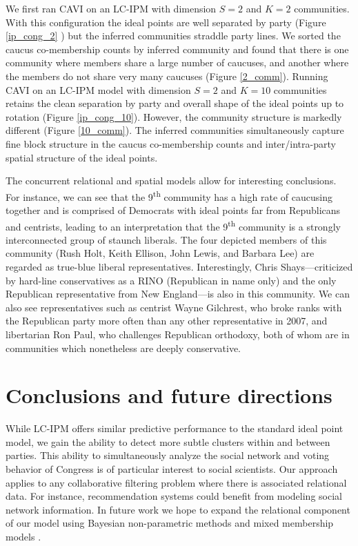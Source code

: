 \documentclass{article}
\begin{document}
We first ran CAVI on an LC-IPM with dimension $S=2$ and $K=2$ communities. With this configuration the ideal points are well separated by party (Figure \ref{ip_cong_2} ) but the inferred communities straddle party lines. We sorted the caucus co-membership counts by inferred community and found that there is one community where members share a large number of caucuses, and another where the members do not share very many caucuses (Figure \ref{2_comm}). Running CAVI on an LC-IPM model with dimension $S=2$ and $K=10$ communities retains the clean separation by party and overall shape of the ideal points up to rotation (Figure \ref{ip_cong_10}). However, the community structure is markedly different (Figure \ref{10_comm}). The inferred communities simultaneously capture fine block structure in the caucus co-membership counts and inter/intra-party spatial structure of the ideal points. 

The concurrent relational and spatial models allow for interesting conclusions. For instance, we can see that the 9\textsuperscript{th} community has a high rate of caucusing together and is comprised of Democrats with ideal points far from Republicans and centrists, leading to an interpretation that the 9\textsuperscript{th} community is a strongly interconnected group of staunch liberals. The four depicted members of this community (Rush Holt, Keith Ellison, John Lewis, and Barbara Lee) are regarded as true-blue liberal representatives. Interestingly, Chris Shays---criticized by hard-line conservatives as a RINO (Republican in name only) and the only Republican representative from New England---is also in this community. We can also see representatives such as centrist Wayne Gilchrest, who broke ranks with the Republican party more often than any other representative in 2007, and libertarian Ron Paul, who challenges Republican orthodoxy, both of whom are in communities which nonetheless are deeply conservative.

\section{Conclusions and future directions} 
While LC-IPM offers similar predictive performance to the standard ideal point model, we gain the ability to detect more subtle clusters within and between parties. This ability to simultaneously analyze the social network and voting behavior of Congress is of particular interest to social scientists. Our approach applies to any collaborative filtering problem where there is associated relational data. For instance, recommendation systems could benefit from modeling social network information. In future work we hope to expand the relational component of our model using Bayesian non-parametric methods and mixed membership models \cite{Airoldi2008}.
\end{document}
